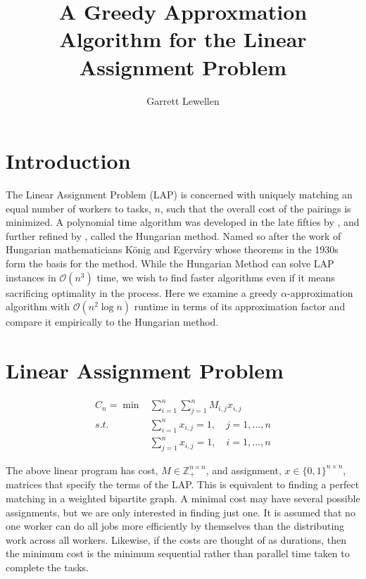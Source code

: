 \documentclass{article}
\newcommand{\boundedBy}[1]{\mathcal{O} \left ( #1 \right )}
\begin{document}
\author{Garrett Lewellen}
\title{A Greedy Approxmation Algorithm for the Linear Assignment Problem}

\maketitle

\section{Introduction}

The Linear Assignment Problem (LAP) is concerned with uniquely matching an equal number of workers to tasks, $n$, such that the overall cost of the pairings is minimized. A polynomial time algorithm was developed in the late fifties by \cite{kuhn1955hungarian}, and further refined by \cite{munkres1957algorithms}, called the Hungarian method. Named so after the work of Hungarian mathematicians K{\"o}nig and Egerv{\'a}ry whose theorems in the 1930s form the basis for the method. While the Hungarian Method can solve LAP instances in $\boundedBy{n^3}$ time, we wish to find faster algorithms even if it means sacrificing optimality in the process. Here we examine a greedy $\alpha$-approximation algorithm with $\boundedBy{n^2 \log n}$ runtime in terms of its approximation factor and compare it empirically to the Hungarian method.

\section{Linear Assignment Problem}

\begin{equation}
\begin{aligned}
	C_n = \min & \sum_{i=1}^{n} \sum_{j=1}^{n} M_{i,j} x_{i,j} \\
	s.t. & \sum_{i=1}^{n} x_{i,j} = 1, \quad j = 1, \ldots, n \\
	& \sum_{j=1}^{n} x_{i,j} = 1, \quad i = 1, \dots, n
	\label{eqn:lap}
\end{aligned}
\end{equation}

The above linear program has cost, $M \in \mathbb{Z}_{+}^{n \times n}$, and assignment, $x \in \lbrace 0,1 \rbrace^{n \times n}$, matrices that specify the terms of the LAP. This is equivalent to finding a perfect matching in a weighted bipartite graph. A minimal cost may have several possible assignments, but we are only interested in finding just one. It is assumed that no one worker can do all jobs more efficiently by themselves than the distributing work across all workers. Likewise, if the costs are thought of as durations, then the minimum cost is the minimum sequential rather than parallel time taken to complete the tasks.
\end{document}
